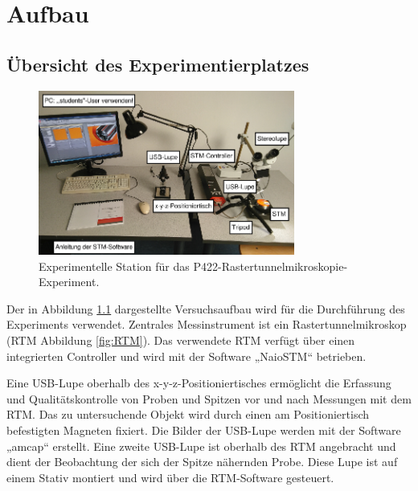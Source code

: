 \chapter{Aufbau}
\section{Übersicht des Experimentierplatzes}

\begin{figure}[htbp]
    \centering
    \includegraphics[width=0.75\textwidth]{figs/Versuchsaufbau1.png}
    \caption{Experimentelle Station für das P422-Rastertunnelmikroskopie-Experiment. \cite{praktikum}}
    \label{fig:Versuchaufbau1}    
\end{figure}
Der in Abbildung \ref{fig:Versuchaufbau1} dargestellte Versuchsaufbau wird für die Durchführung des Experiments verwendet. Zentrales Messinstrument ist ein Rastertunnelmikroskop (RTM Abbildung \ref{fig:RTM}). Das verwendete RTM verfügt über einen integrierten Controller und wird mit der Software „NaioSTM“ betrieben.

Eine USB-Lupe oberhalb des x-y-z-Positioniertisches ermöglicht die Erfassung und Qualitätskontrolle von Proben und Spitzen vor und nach Messungen mit dem RTM. Das zu untersuchende Objekt wird durch einen am Positioniertisch befestigten Magneten fixiert. Die Bilder der USB-Lupe werden mit der Software „amcap“ erstellt. Eine zweite USB-Lupe ist oberhalb des RTM angebracht und dient der Beobachtung der sich der Spitze nähernden Probe. Diese Lupe ist auf einem Stativ montiert und wird über die RTM-Software gesteuert.


